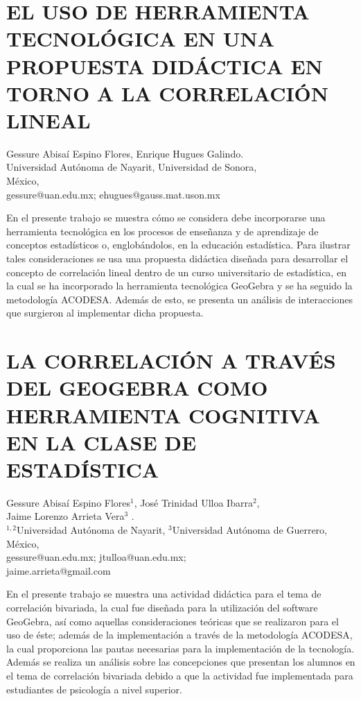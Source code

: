 \section{EL USO DE HERRAMIENTA TECNOLÓGICA EN UNA PROPUESTA DIDÁCTICA EN TORNO
A LA CORRELACIÓN LINEAL }

\begin{datos}
Gessure Abisaí Espino Flores, Enrique Hugues Galindo. \\
Universidad Autónoma de Nayarit, Universidad de Sonora,  \\
\hfill México, \\
\hfill gessure@uan.edu.mx; ehugues@gauss.mat.uson.mx
\end{datos}

En el presente trabajo se muestra cómo se considera debe incorporarse
una herramienta tecnológica en los procesos de enseñanza y de aprendizaje
de conceptos estadísticos o, englobándolos, en la educación estadística.
Para ilustrar tales consideraciones se usa una propuesta didáctica
diseñada para desarrollar el concepto de correlación lineal dentro
de un curso universitario de estadística, en la cual se ha incorporado
la herramienta tecnológica GeoGebra y se ha seguido la metodología
ACODESA. Además de esto, se presenta un análisis de interacciones
que surgieron al implementar dicha propuesta. 


\section{LA CORRELACIÓN A TRAVÉS DEL GEOGEBRA COMO HERRAMIENTA COGNITIVA EN
LA CLASE DE ESTADÍSTICA}

\begin{datos}
Gessure Abisaí Espino Flores$^1$, José Trinidad Ulloa Ibarra$^2$,\\ Jaime Lorenzo Arrieta Vera$^3$ . \\
 $^{1,2}$Universidad Autónoma de Nayarit, $^3$Universidad Autónoma de Guerrero,  \\
\hfill México, \\
\hfill gessure@uan.edu.mx; jtulloa@uan.edu.mx;\\ \hfill jaime.arrieta@gmail.com
\end{datos}

En el presente trabajo se muestra una actividad didáctica para el
tema de correlación bivariada, la cual fue diseñada para la utilización
del software GeoGebra, así como aquellas consideraciones teóricas
que se realizaron para el uso de éste; además de la implementación
a través de la metodología ACODESA, la cual proporciona las pautas
necesarias para la implementación de la tecnología. Además se realiza
un análisis sobre las concepciones que presentan los alumnos en el
tema de correlación bivariada debido a que la actividad fue implementada
para estudiantes de psicología a nivel superior.


